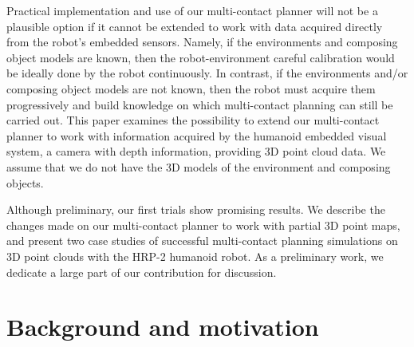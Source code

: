 Practical implementation and use of our multi-contact planner will not be a plausible option if it cannot be extended to work with data acquired directly from the robot's embedded sensors. Namely, if the environments and composing object models are known, then the robot-environment careful calibration would be ideally done by the robot continuously. In contrast, if the environments and/or composing object models are not known, then the robot must acquire them progressively and build knowledge on which multi-contact planning can still be carried out. This paper examines the possibility to extend our multi-contact planner to work with information acquired by the humanoid embedded visual system, a camera with depth information, providing 3D point cloud data. We assume that we do not have the 3D models of the environment and composing objects. 

Although preliminary, our first trials show promising results. We describe the changes made on our multi-contact planner to work with partial 3D point maps, and present two case studies of successful multi-contact planning simulations on 3D point clouds with the HRP-2 humanoid robot. As a preliminary work, we dedicate a large part of our contribution for discussion.

\section{Background and motivation}

